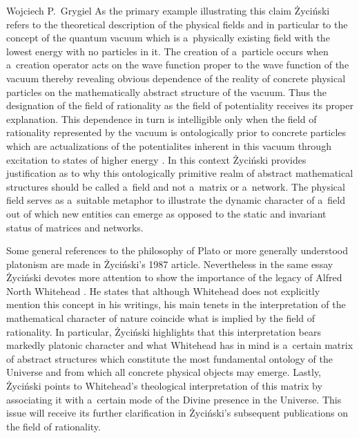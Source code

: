 \begin{artengenv}{Wojciech P.~Grygiel}
As the primary example illustrating this claim Życiński refers to the theoretical description of the physical fields and in particular to the concept of the quantum vacuum which is a~physically existing field with the lowest energy with no particles in it. The creation of a~particle occurs when a~creation operator acts on the wave function proper to the wave function of the vacuum thereby revealing obvious dependence of the reality of concrete physical particles on the mathematically abstract structure of the vacuum. Thus the designation of the field of rationality as the field of potentiality receives its proper explanation. This dependence in turn is intelligible only when the field of rationality represented by the vacuum is ontologically prior to concrete particles which are actualizations of the potentialites inherent in this vacuum through excitation to states of higher energy
\parencite[][pp.176–178]{zycinski_filozoficzne_1987}. %
 In this context Życiński provides justification as to why this ontologically primitive realm of abstract mathematical structures should be called a~field and not a~matrix or a~network. The physical field serves as a~suitable metaphor to illustrate the dynamic character of a~field out of which new entities can emerge as opposed to the static and invariant status of matrices and networks.

Some general references to the philosophy of Plato or more generally understood platonism are made in Życiński's 1987 article. Nevertheless in the same essay Życiński devotes more attention to show the importance of the legacy of Alfred North Whitehead
\parencite[][pp.181–185]{zycinski_filozoficzne_1987}. %
 He states that although Whitehead does not explicitly mention this concept in his writings, his main tenets in the interpretation of the mathematical character of nature coincide what is implied by the field of rationality. In particular, Życiński highlights that this interpretation bears markedly platonic character and what Whitehead has in mind is a~certain matrix of abstract structures which constitute the most fundamental ontology of the Universe and from which all concrete physical objects may emerge. Lastly, Życiński points to Whitehead's theological interpretation of this matrix by associating it with a~certain mode of the Divine presence in the Universe. This issue will receive its further clarification in Życiński's subsequent publications on the field of rationality.


\end{artengenv}
